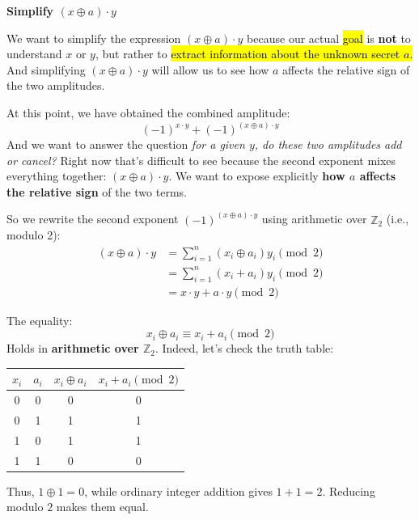 \newpage

\begin{flushleft}
    \textcolor{Green3}{ \textbf{Simplify $\left(x \oplus a\right) \cdot y$}}
\end{flushleft}
We want to simplify the expression $(x \oplus a) \cdot y$ because our actual \hl{goal} is \textbf{not} to understand $x$ or $y$, but rather to \hl{extract information about the unknown secret $a$.} And simplifying $(x \oplus a) \cdot y$ will allow us to see how $a$ affects the relative sign of the two amplitudes.

\highspace
At this point, we have obtained the combined amplitude:
\begin{equation*}
    \left(-1\right)^{x \cdot y} + \left(-1\right)^{(x\oplus a) \cdot y}
\end{equation*}
And we want to answer the question \emph{for a given $y$, do these two amplitudes add or cancel?} Right now that's difficult to see because the second exponent mixes everything together: $(x \oplus a) \cdot y$. We want to expose explicitly \textbf{how $a$ affects the relative sign} of the two terms.

\highspace
So we rewrite the second exponent $(-1)^{(x \oplus a) \cdot y}$ using arithmetic over $\mathbb{Z}_{2}$ (i.e., modulo 2):
\begin{align*}
    (x \oplus a) \cdot y
    &= \sum_{i=1}^{n} (x_i \oplus a_i)y_i \pmod 2 \\[.3em]
    &= \sum_{i=1}^{n} (x_i + a_i)y_i \pmod 2 \\[.3em]
    &= x \cdot y + a \cdot y \pmod 2
\end{align*}

\begin{remarkbox}[: $\oplus$ vs $+$]
    The equality:
    \begin{equation*}
        x_i \oplus a_i \equiv x_i + a_i \pmod 2
    \end{equation*}
    Holds in \textbf{arithmetic over $\mathbb{Z}_2$}. Indeed, let's check the truth table:
    \begin{center}
        \begin{tabular}{@{} c|c|c|c @{}}
            \toprule
            $x_i$ & $a_i$ & $x_i \oplus a_i$ & $x_i + a_i \pmod 2$ \\ \midrule
            0 & 0 & 0 & 0 \\
            0 & 1 & 1 & 1 \\
            1 & 0 & 1 & 1 \\
            1 & 1 & 0 & 0 \\
            \bottomrule
        \end{tabular}
    \end{center}
    Thus, $1\oplus1=0$, while ordinary integer addition gives $1+1=2$. Reducing modulo $2$ makes them equal.
\end{remarkbox}

